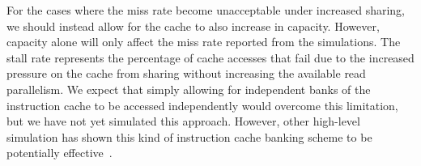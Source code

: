 For the cases where the miss rate become unacceptable under increased
sharing, we should instead allow for the cache to also increase in
capacity. 
However, capacity alone will only affect the miss rate reported from
the simulations.
The stall rate represents the percentage of cache accesses that fail
due to the increased pressure on the cache from sharing without
increasing the available read parallelism.
We expect that simply allowing for independent banks of the
instruction cache to be accessed independently would overcome this
limitation, but we have not yet simulated this approach.
However, other high-level simulation has shown this kind of
instruction cache banking scheme to be potentially
effective~\cite{kopta10}. 






